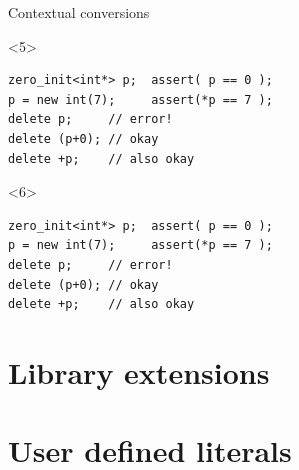 \documentclass[10pt]{beamer}
\begin{document}
\begin{frame}[fragile]{Contextual conversions}
	\begin{onlyenv}
	\begin{verbatim}
zero_init<int*> p;  assert( p == 0 );
p = new int(7);     assert(*p == 7 );
delete p;     // error!
delete (p+0); // okay
delete +p;    // also okay
	\end{verbatim}
	\end{onlyenv}

	\begin{onlyenv}
	\begin{verbatim}
zero_init<int*> p;  assert( p == 0 );
p = new int(7);     assert(*p == 7 );
delete p;     // error!
delete (p+0); // okay
delete +p;    // also okay
	\end{verbatim}
	\end{onlyenv}
\end{frame}

\section{Library extensions}
\section{User defined literals}
\end{document}
